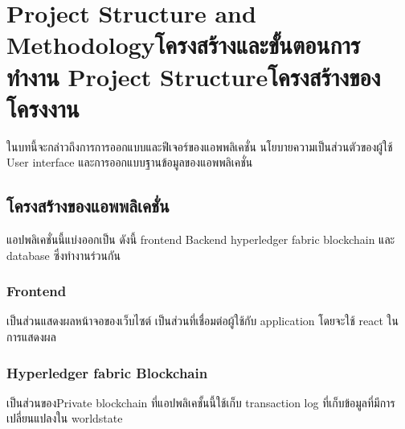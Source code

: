 \chapter{\ifproject%
\ifenglish Project Structure and Methodology\else โครงสร้างและขั้นตอนการทำงาน\fi
\else%
\ifenglish Project Structure\else โครงสร้างของโครงงาน\fi
\fi
}

\enskip \enskip \enskip \enskip \enskip ในบทนี้จะกล่าวถึงการการออกแบบและฟีเจอร์ของแอพพลิเคชั่น นโยบายความเป็นส่วนตัวของผู้ใช้ User interface และการออกแบบฐานข้อมูลของแอพพลิเคชั่น



\makeatletter


\makeatother

\section{โครงสร้างของแอพพลิเคชั่น}
\enskip \enskip \enskip \enskip \enskip 
แอปพลิเคชั่นนี้แบ่งออกเป็น ดังนี้ frontend
Backend hyperledger fabric blockchain และ database ซึ่งทำงานร่วนกัน
\subsection{Frontend}
\enskip \enskip \enskip \enskip \enskip 
เป็นส่วนแสดงผลหน้าจอของเว็บไซต์ เป็นส่วนที่เชื่อมต่อผู้ใช้กับ application โดยจะใช้ react ในการแสดงผล

\subsection{Hyperledger fabric Blockchain}
\enskip \enskip \enskip \enskip \enskip 
เป็นส่วนของPrivate blockchain ที่แอปพลิเคชั้นนี้ใช้เก็บ transaction log ที่เก็บข้อมูลที่มีการเปลี่ยนแปลงใน worldstate


